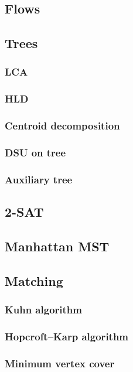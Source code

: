 \subsection{Flows}

\subsection{Trees}
  \subsubsection{LCA}
  \subsubsection{HLD}
  \subsubsection{Centroid decomposition}
  \subsubsection{DSU on tree}
  \subsubsection{Auxiliary tree}

\subsection{2-SAT}

\subsection{Manhattan MST}

\subsection{Matching}
  \subsubsection{Kuhn algorithm}
  \subsubsection{Hopcroft–Karp algorithm}
  \subsubsection{Minimum vertex cover}
